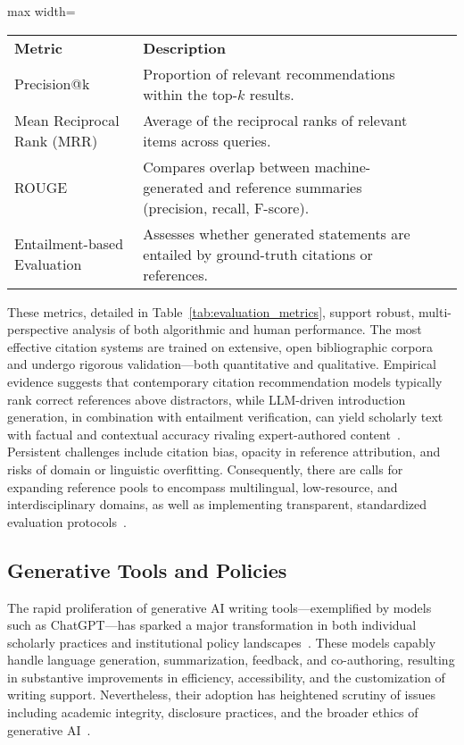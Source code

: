 \documentclass[sigconf]{acmart}
\begin{document}
\begin{table*}[htbp]
\centering
\caption{Key Evaluation Metrics for Citation Recommendation and Scholarly Text Generation}
\label{tab:evaluation_metrics}
\begin{adjustbox}{max width=\textwidth}
\begin{tabular}{@{}llll@{}}
\toprule
\textbf{Metric} & \textbf{Description} & & \\
Precision@k & Proportion of relevant recommendations within the top-$k$ results. & & \\
Mean Reciprocal Rank (MRR) & Average of the reciprocal ranks of relevant items across queries. & & \\
ROUGE & Compares overlap between machine-generated and reference summaries (precision, recall, F-score). & & \\
Entailment-based Evaluation & Assesses whether generated statements are entailed by ground-truth citations or references. & & \\
\bottomrule
\end{tabular}
\end{adjustbox}
\end{table*}

These metrics, detailed in Table~\ref{tab:evaluation_metrics}, support robust, multi-perspective analysis of both algorithmic and human performance. The most effective citation systems are trained on extensive, open bibliographic corpora and undergo rigorous validation—both quantitative and qualitative. Empirical evidence suggests that contemporary citation recommendation models typically rank correct references above distractors, while LLM-driven introduction generation, in combination with entailment verification, can yield scholarly text with factual and contextual accuracy rivaling expert-authored content~\cite{ref107}. Persistent challenges include citation bias, opacity in reference attribution, and risks of domain or linguistic overfitting. Consequently, there are calls for expanding reference pools to encompass multilingual, low-resource, and interdisciplinary domains, as well as implementing transparent, standardized evaluation protocols~\cite{ref107}.

\subsection{Generative Tools and Policies}

The rapid proliferation of generative AI writing tools—exemplified by models such as ChatGPT—has sparked a major transformation in both individual scholarly practices and institutional policy landscapes~\cite{ref104,ref109,ref110}. These models capably handle language generation, summarization, feedback, and co-authoring, resulting in substantive improvements in efficiency, accessibility, and the customization of writing support. Nevertheless, their adoption has heightened scrutiny of issues including academic integrity, disclosure practices, and the broader ethics of generative AI~\cite{ref104,ref109}.
\end{document}
